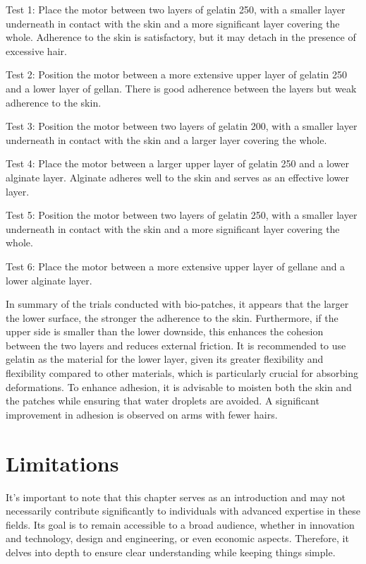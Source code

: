 \item Test 1: Place the motor between two layers of gelatin 250, with a smaller layer underneath in contact with the skin and a more significant layer covering the whole. Adherence to the skin is satisfactory, but it may detach in the presence of excessive hair.
\item Test 2: Position the motor between a more extensive upper layer of gelatin 250 and a lower layer of gellan. There is good adherence between the layers but weak adherence to the skin.
\item Test 3: Position the motor between two layers of gelatin 200, with a smaller layer underneath in contact with the skin and a larger layer covering the whole.
\item Test 4: Place the motor between a larger upper layer of gelatin 250 and a lower alginate layer. Alginate adheres well to the skin and serves as an effective lower layer.
\item Test 5: Position the motor between two layers of gelatin 250, with a smaller layer underneath in contact with the skin and a more significant layer covering the whole.
\item Test 6: Place the motor between a more extensive upper layer of gellane and a lower alginate layer.

In summary of the trials conducted with bio-patches, it appears that the larger the lower surface, the stronger the adherence to the skin. Furthermore, if the upper side is smaller than the lower downside, this enhances the cohesion between the two layers and reduces external friction. It is recommended to use gelatin as the material for the lower layer, given its greater flexibility and flexibility compared to other materials, which is particularly crucial for absorbing deformations. To enhance adhesion, it is advisable to moisten both the skin and the patches while ensuring that water droplets are avoided. A significant improvement in adhesion is observed on arms with fewer hairs.

\section{Limitations}
It's important to note that this chapter serves as an introduction and may not necessarily contribute significantly to individuals with advanced expertise in these fields. Its goal is to remain accessible to a broad audience, whether in innovation and technology, design and engineering, or even economic aspects. Therefore, it delves into depth to ensure clear understanding while keeping things simple. 

